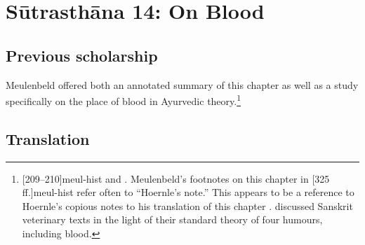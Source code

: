 
\chapter{Sūtrasthāna 14:  On Blood}


\section{Previous scholarship}

Meulenbeld offered both an annotated summary of this chapter as well as a
study specifically on the place of blood in Ayurvedic
theory.\footnote{[209--210]{meul-hist}  and \cite{meul-1991}.
    Meulenbeld's footnotes on this chapter in
    [325\,ff.]{meul-hist} refer often to ``Hoernle's note.'' 
    This appears to be a reference to Hoernle's copious notes to his
    translation of this chapter \citep[87--98]{hoer-1897}. \citet{meul-1990} 
    discussed Sanskrit veterinary texts in the light of their standard theory of four 
    humours, including blood.}

\section{Translation}

